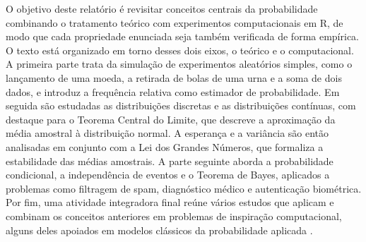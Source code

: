 O objetivo deste relatório é revisitar conceitos centrais da probabilidade
combinando o tratamento teórico com experimentos computacionais em R, de modo que
cada propriedade enunciada seja também verificada de forma empírica. O texto está
organizado em torno desses dois eixos, o teórico e o computacional. A primeira
parte trata da simulação de experimentos aleatórios simples, como o lançamento de
uma moeda, a retirada de bolas de uma urna e a soma de dois dados, e introduz a
frequência relativa como estimador de probabilidade. Em seguida são estudadas as
distribuições discretas e as distribuições contínuas, com destaque para o Teorema
Central do Limite, que descreve a aproximação da média amostral à distribuição
normal. A esperança e a variância são então analisadas em conjunto com a Lei dos
Grandes Números, que formaliza a estabilidade das médias amostrais. A parte
seguinte aborda a probabilidade condicional, a independência de eventos e o Teorema
de Bayes, aplicados a problemas como filtragem de spam, diagnóstico médico e
autenticação biométrica. Por fim, uma atividade integradora final reúne vários
estudos que aplicam e combinam os conceitos anteriores em problemas de inspiração
computacional, alguns deles apoiados em modelos clássicos da probabilidade aplicada
\cite{ross2024models}.
